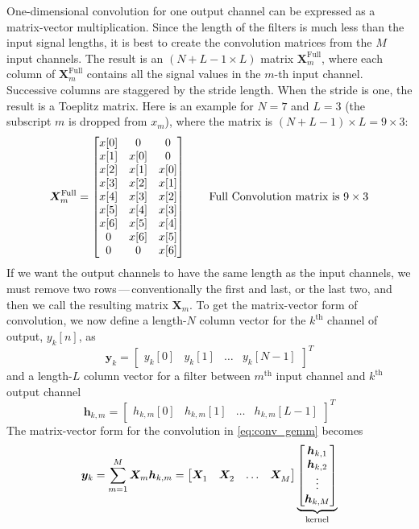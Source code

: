 \documentclass{article}
\begin{document}
One-dimensional convolution for one output channel can be expressed as a matrix-vector multiplication.
Since the length of the filters is much less than the input signal lengths, it is best to create the convolution matrices from the $M$ input channels.
The result is an $(N+L-1\times L)$ matrix $\bm X^{\text{Full}}_m$, where each column of $\bm X^{\text{Full}}_m$ contains all the signal values in the $m$-th input channel.
Successive columns are staggered by the stride length.
When the stride is one, the result is a Toeplitz matrix.
Here is an example for $N=7$ and $L=3$ (the subscript $m$ is dropped from $x_m$), where the matrix is $(N+L-1)\times L = 9\times 3$:
\begin{equation*}
 \bm X^{\text{Full}}_m =
\begin{bmatrix}
x[0] & 0    & 0\cr
x[1] & x[0] & 0 \cr
x[2] & x[1] & x[0] \cr
x[3] & x[2] & x[1] \cr
x[4] & x[3] & x[2] \cr
x[5] & x[4] & x[3] \cr
x[6] & x[5] & x[4] \cr
0    & x[6] & x[5] \cr
0    & 0    & x[6] \cr
\end{bmatrix}
\qquad \text{Full Convolution matrix is } 9\times 3
\end{equation*}
If we want the output channels to have the same length as the input channels, we must remove two rows\,---\,conventionally the first and last, or the last two, and then we call the resulting matrix $\bm X_m$.
To get the matrix-vector form of convolution, we now define a length-$N$ column vector for the $k^\text{th}$ channel of output, $y_k[n]$, as
\[
 \bm y_k = 
 \begin{bmatrix} y_k[0] & y_k[1] & \ldots & y_k[N-1] \end{bmatrix}^T
\]
and a length-$L$ column vector for a filter between $m^\text{th}$ input channel and $k^\text{th}$ output channel
\[
 \bm h_{k,m} = 
 \begin{bmatrix} h_{k,m}[0] &  h_{k,m}[1] & \ldots & h_{k,m}[L-1] \end{bmatrix}^T
\]
The matrix-vector form for the convolution in \eqref{eq:conv_gemm} becomes
\[
\bm y_k = \sum\limits_{m=1}^{M} \bm X_m \bm h_{k,m}
=
\begin{bmatrix}
\bm X_1^{\phantom{.}} &  \bm X_2^{\phantom{.}} & \ldots & \bm X_M^{\phantom{.}}
\end{bmatrix}
\underbrace{\begin{bmatrix}
\bm h_{k,1} \cr  \bm h_{k,2} \cr  \vdots \cr  \bm h_{k,M}
\end{bmatrix}}_{\text{kernel}}
\]
\end{document}
